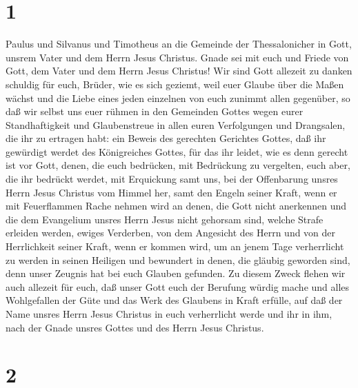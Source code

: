 \hypertarget{section}{%
\section{1}\label{section}}

 Paulus und Silvanus und Timotheus an die Gemeinde der
Thessalonicher in Gott, unsrem Vater und dem Herrn Jesus Christus.
 Gnade sei mit euch und Friede von Gott, dem Vater und dem
Herrn Jesus Christus!  Wir sind Gott allezeit zu danken
schuldig für euch, Brüder, wie es sich geziemt, weil euer Glaube über
die Maßen wächst und die Liebe eines jeden einzelnen von euch zunimmt
allen gegenüber,  so daß wir selbst uns euer rühmen in den
Gemeinden Gottes wegen eurer Standhaftigkeit und Glaubenstreue in allen
euren Verfolgungen und Drangsalen, die ihr zu ertragen habt:
 ein Beweis des gerechten Gerichtes Gottes, daß ihr
gewürdigt werdet des Königreiches Gottes, für das ihr leidet,
 wie es denn gerecht ist vor Gott, denen, die euch
bedrücken, mit Bedrückung zu vergelten,  euch aber, die
ihr bedrückt werdet, mit Erquickung samt uns, bei der Offenbarung unsres
Herrn Jesus Christus vom Himmel her, samt den Engeln seiner Kraft,
 wenn er mit Feuerflammen Rache nehmen wird an denen, die
Gott nicht anerkennen und die dem Evangelium unsres Herrn Jesus nicht
gehorsam sind,  welche Strafe erleiden werden, ewiges
Verderben, von dem Angesicht des Herrn und von der Herrlichkeit seiner
Kraft,  wenn er kommen wird, um an jenem Tage
verherrlicht zu werden in seinen Heiligen und bewundert in denen, die
gläubig geworden sind, denn unser Zeugnis hat bei euch Glauben gefunden.
 Zu diesem Zweck flehen wir auch allezeit für euch, daß
unser Gott euch der Berufung würdig mache und alles Wohlgefallen der
Güte und das Werk des Glaubens in Kraft erfülle,  auf daß
der Name unsres Herrn Jesus Christus in euch verherrlicht werde und ihr
in ihm, nach der Gnade unsres Gottes und des Herrn Jesus Christus.

\hypertarget{section-1}{%
\section{2}\label{section-1}}


